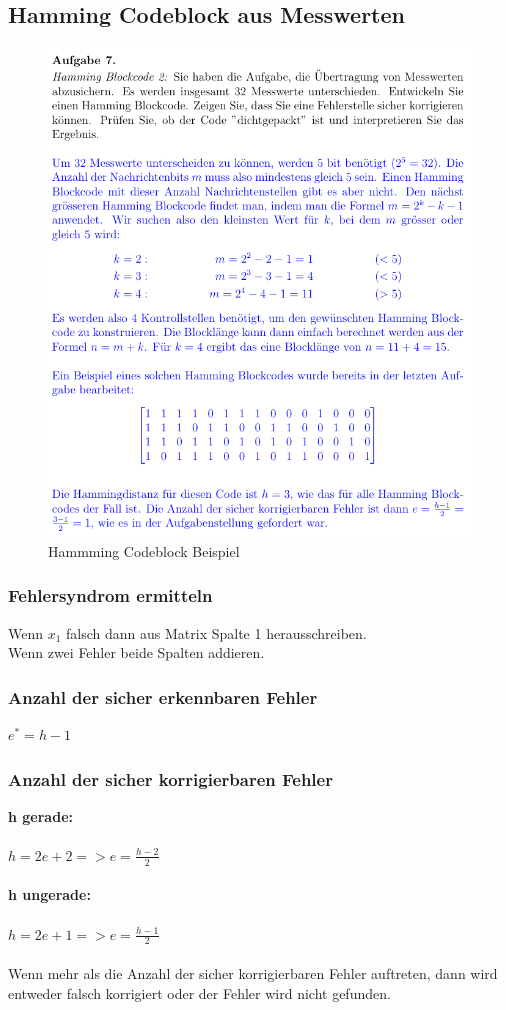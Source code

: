 \subsection{Hamming Codeblock aus Messwerten}
\begin{figure}[h!]
	\centering
	\begin{minipage}[t]{0.9\textwidth}
		\centering
		\includegraphics[width=0.9\linewidth]{images/aufgabe7}
		\caption{Hammming Codeblock Beispiel}
		\label{fig:aufgabe7}
	\end{minipage}
\end{figure}
\clearpage

\subsubsection{Fehlersyndrom ermitteln}
Wenn $x_1$ falsch dann aus Matrix Spalte 1 herausschreiben. \\
Wenn zwei Fehler beide Spalten addieren.

\subsubsection{Anzahl der sicher erkennbaren Fehler}
$e^*=h-1$

\subsubsection{Anzahl der sicher korrigierbaren Fehler}
\textbf{h gerade:} \\
\\
$h=2e+2=>e=\frac{h-2}{2}$
\\
\\
\textbf{h ungerade:} \\
\\
$h=2e+1=>e=\frac{h-1}{2}$ \\
\\
Wenn mehr als die Anzahl der sicher korrigierbaren Fehler auftreten, dann wird entweder falsch korrigiert oder der Fehler wird nicht gefunden.

